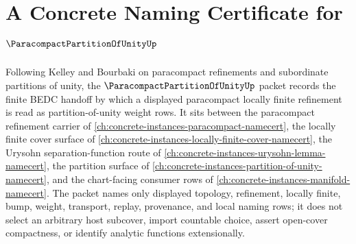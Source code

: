 \chapter{A Concrete Naming Certificate for $\ParacompactPartitionOfUnityUp$}
\label{ch:concrete-instances-paracompact-partition-of-unity-namecert}

Following Kelley and Bourbaki on paracompact refinements and subordinate partitions of unity, the $\ParacompactPartitionOfUnityUp$ packet records the finite BEDC handoff by which a displayed paracompact locally finite refinement is read as partition-of-unity weight rows. It sits between the paracompact refinement carrier of \autoref{ch:concrete-instances-paracompact-namecert}, the locally finite cover surface of \autoref{ch:concrete-instances-locally-finite-cover-namecert}, the Urysohn separation-function route of \autoref{ch:concrete-instances-urysohn-lemma-namecert}, the partition surface of \autoref{ch:concrete-instances-partition-of-unity-namecert}, and the chart-facing consumer rows of \autoref{ch:concrete-instances-manifold-namecert}. The packet names only displayed topology, refinement, locally finite, bump, weight, transport, replay, provenance, and local naming rows; it does not select an arbitrary host subcover, import countable choice, assert open-cover compactness, or identify analytic functions extensionally.

